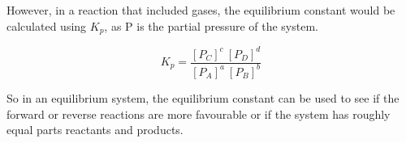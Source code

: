 However, in a reaction that included gases, the equilibrium constant would be calculated using \begin{math}K_{p}\end{math}, as P is the partial pressure of the system.

\begin{figure}[htp]
    \centering
    \[
        K_{p} = \frac{[P_{C}]^c \ [P_{D}]^d}{[P_{A}]^a \ [P_{B}]^b}
    \]
    \caption{}
    \label{fig:enter-label}
\end{figure}

So in an equilibrium system, the equilibrium constant can be used to see if the forward or reverse reactions are more favourable or if the system has roughly equal parts reactants and products.










